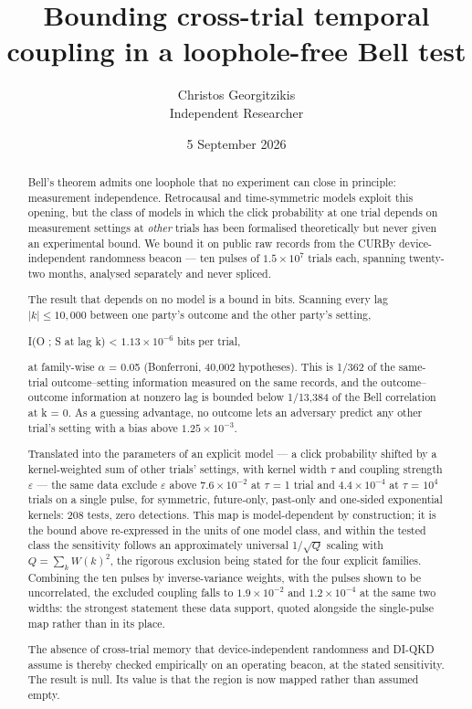 \documentclass[
  11pt,
]{article}
\title{Bounding cross-trial temporal coupling in a loophole-free Bell
test}
\author{Christos Georgitzikis\\
\normalsize Independent Researcher}
\date{5 September 2026}
\begin{document}
\maketitle
\begin{abstract}
Bell's theorem admits one loophole that no experiment can close in
principle: measurement independence. Retrocausal and time-symmetric
models exploit this opening, but the class of models in which the click
probability at one trial depends on measurement settings at \emph{other}
trials has been formalised theoretically but never given an experimental
bound. We bound it on public raw records from the CURBy
device-independent randomness beacon --- ten pulses of
\(1.5 \times 10^{7}\) trials each, spanning twenty-two months, analysed
separately and never spliced.

The result that depends on no model is a bound in bits. Scanning every
lag \(|k| \le 10{,}000\) between one party's outcome and the other
party's setting,

I(O ; S at lag k) \textless{} \(1.13 \times 10^{-6}\) bits per trial,

at family-wise \(\alpha\) = 0.05 (Bonferroni, 40,002 hypotheses). This
is 1/362 of the same-trial outcome--setting information measured on the
same records, and the outcome--outcome information at nonzero lag is
bounded below 1/13,384 of the Bell correlation at k = 0. As a guessing
advantage, no outcome lets an adversary predict any other trial's
setting with a bias above \(1.25 \times 10^{-3}\).

Translated into the parameters of an explicit model --- a click
probability shifted by a kernel-weighted sum of other trials' settings,
with kernel width \(\tau\) and coupling strength \(\varepsilon\) --- the
same data exclude \(\varepsilon\) above \(7.6 \times 10^{-2}\) at
\(\tau\) = 1 trial and \(4.4 \times 10^{-4}\) at \(\tau\) = \(10^{4}\)
trials on a single pulse, for symmetric, future-only, past-only and
one-sided exponential kernels: 208 tests, zero detections. This map is
model-dependent by construction; it is the bound above re-expressed in
the units of one model class, and within the tested class the
sensitivity follows an approximately universal 1/\(\sqrt{Q}\) scaling
with \(Q=\sum_k W(k)^2\), the rigorous exclusion being stated for the
four explicit families. Combining the ten pulses by inverse-variance
weights, with the pulses shown to be uncorrelated, the excluded coupling
falls to \(1.9 \times 10^{-2}\) and \(1.2 \times 10^{-4}\) at the same
two widths: the strongest statement these data support, quoted alongside
the single-pulse map rather than in its place.

The absence of cross-trial memory that device-independent randomness and
DI-QKD assume is thereby checked empirically on an operating beacon, at
the stated sensitivity. The result is null. Its value is that the region
is now mapped rather than assumed empty.
\end{abstract}
\end{document}
